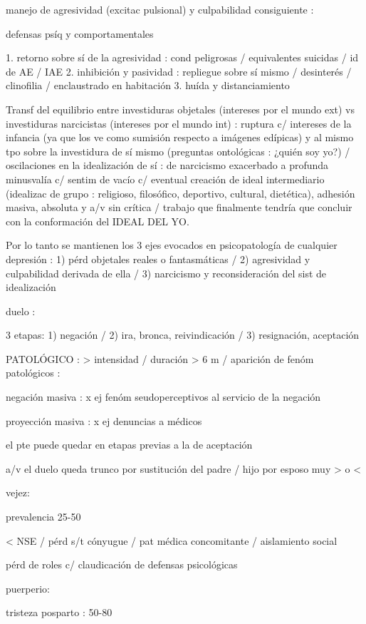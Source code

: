 manejo de agresividad (excitac pulsional) y culpabilidad consiguiente :

defensas psíq y comportamentales

1. retorno sobre sí de la agresividad : cond peligrosas / equivalentes suicidas / id de AE / IAE
2. inhibición y pasividad : repliegue sobre sí mismo / desinterés / clinofilia / enclaustrado en habitación
3. huída y distanciamiento

Transf del equilibrio entre investiduras objetales (intereses por el mundo ext) vs investiduras narcicistas (intereses por el mundo int) : ruptura c/ intereses de la infancia (ya que los ve como sumisión respecto a imágenes edípicas) y al mismo tpo sobre la investidura de sí mismo (preguntas ontológicas : ¿quién soy yo?) / oscilaciones en la idealización de sí : de narcicismo exacerbado a profunda minusvalía c/ sentim de vacío c/ eventual creación de ideal intermediario (idealizac de grupo : religioso, filosófico, deportivo, cultural, dietética), adhesión masiva, absoluta y a/v sin crítica / trabajo que finalmente tendría que concluir con la conformación del IDEAL DEL YO.

Por lo tanto se mantienen los 3 ejes evocados en psicopatología de cualquier depresión : 1) pérd objetales reales o fantasmáticas / 2) agresividad y culpabilidad derivada de ella / 3) narcicismo y reconsideración del sist de idealización

duelo :

3 etapas: 1) negación / 2) ira, bronca, reivindicación / 3) resignación, aceptación

PATOLÓGICO : > intensidad / duración > 6 m / aparición de fenóm patológicos :

negación masiva : x ej fenóm seudoperceptivos al servicio de la negación

proyección masiva : x ej denuncias a médicos

el pte puede quedar en etapas previas a la de aceptación

a/v el duelo queda trunco por sustitución del padre / hijo por esposo muy > o <

vejez:

prevalencia 25-50%

< NSE / pérd s/t cónyugue / pat médica concomitante / aislamiento social

pérd de roles c/ claudicación de defensas psicológicas

puerperio:

tristeza posparto : 50-80%

